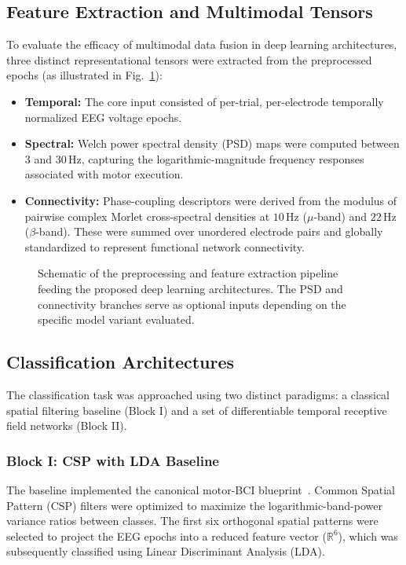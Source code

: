 \subsection{Feature Extraction and Multimodal Tensors}
\label{sec:features}
To evaluate the efficacy of multimodal data fusion in deep learning architectures, three distinct representational tensors were extracted from the preprocessed epochs (as illustrated in Fig.~\ref{fig:pipe}):
\begin{itemize}
    \item \textbf{Temporal:} The core input consisted of per-trial, per-electrode temporally normalized EEG voltage epochs.
    \item \textbf{Spectral:} Welch power spectral density (PSD) maps were computed between $3$ and $30\,\text{Hz}$, capturing the logarithmic-magnitude frequency responses associated with motor execution.
    \item \textbf{Connectivity:} Phase-coupling descriptors were derived from the modulus of pairwise complex Morlet cross-spectral densities at $10\,\text{Hz}$ ($\mu$-band) and $22\,\text{Hz}$ ($\beta$-band). These were summed over unordered electrode pairs and globally standardized to represent functional network connectivity.
\end{itemize}

\begin{figure}[t]
  \centering
  
  \caption{Schematic of the preprocessing and feature extraction pipeline feeding the proposed deep learning architectures. The PSD and connectivity branches serve as optional inputs depending on the specific model variant evaluated.}
  \label{fig:pipe}
\end{figure}

\subsection{Classification Architectures}
\label{sec:architectures}
The classification task was approached using two distinct paradigms: a classical spatial filtering baseline (Block I) and a set of differentiable temporal receptive field networks (Block II).

\subsubsection{Block I: CSP with LDA Baseline}
The baseline implemented the canonical motor-BCI blueprint~\cite{gramfort2013meg}. Common Spatial Pattern (CSP) filters were optimized to maximize the logarithmic-band-power variance ratios between classes. The first six orthogonal spatial patterns were selected to project the EEG epochs into a reduced feature vector ($\mathbb{R}^6$), which was subsequently classified using Linear Discriminant Analysis (LDA).


